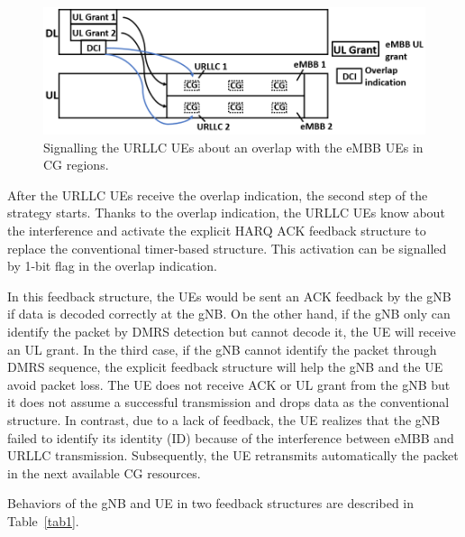 \documentclass{ieeeaccess}
\begin{document}
\begin{figure}[htbp]
\centerline{\includegraphics[scale=0.32]{fig2.PNG}}
\caption{Signalling the URLLC UEs about an overlap with the eMBB UEs in CG regions.}
\label{fig2}
\vspace{-2mm}
\end{figure}

After the URLLC UEs receive the overlap indication, the second step of the strategy starts. Thanks to the overlap indication, the URLLC UEs know about the interference and activate the explicit HARQ ACK feedback structure to replace the conventional timer-based structure. This activation can be signalled by 1-bit flag in the overlap indication. 

In this feedback structure, the UEs would be sent an ACK feedback by the gNB if data is decoded correctly at the gNB. On the other hand, if the gNB only can identify the packet by DMRS detection but cannot decode it, the UE will receive an UL grant. In the third case, if the gNB cannot identify the packet through DMRS sequence, the explicit feedback structure will help the gNB and the UE avoid packet loss. The UE does not receive ACK or UL grant from the gNB but it does not assume a successful transmission and drops data as the conventional structure. In contrast, due to a lack of feedback, the UE realizes that the gNB failed to identify its identity (ID) because of the interference between eMBB and URLLC transmission. Subsequently, the UE retransmits automatically the packet in the next available CG resources. 

Behaviors of the gNB and UE in two feedback structures are described in Table~\ref{tab1}.
\end{document}
